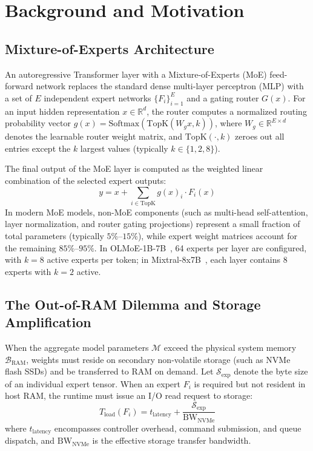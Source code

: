\section{Background and Motivation}
\label{sec:background}

\subsection{Mixture-of-Experts Architecture}
An autoregressive Transformer layer with a Mixture-of-Experts (MoE) feed-forward network replaces the standard dense multi-layer perceptron (MLP) with a set of $E$ independent expert networks $\{F_i\}_{i=1}^E$ and a gating router $G(x)$. For an input hidden representation $x \in \mathbb{R}^d$, the router computes a normalized routing probability vector $g(x) = \text{Softmax}(\text{TopK}(W_g x, k))$, where $W_g \in \mathbb{R}^{E \times d}$ denotes the learnable router weight matrix, and $\text{TopK}(\cdot, k)$ zeroes out all entries except the $k$ largest values (typically $k \in \{1, 2, 8\}$).

The final output of the MoE layer is computed as the weighted linear combination of the selected expert outputs:
\begin{equation}
    y = x + \sum_{i \in \text{TopK}} g(x)_i \cdot F_i(x)
    \label{eq:moe_forward}
\end{equation}
In modern MoE models, non-MoE components (such as multi-head self-attention, layer normalization, and router gating projections) represent a small fraction of total parameters (typically $5\%$--$15\%$), while expert weight matrices account for the remaining $85\%$--$95\%$. In OLMoE-1B-7B~\citep{muennighoff2024olmoe}, 64 experts per layer are configured, with $k=8$ active experts per token; in Mixtral-8x7B~\citep{jiang2024mixtral}, each layer contains 8 experts with $k=2$ active.

\subsection{The Out-of-RAM Dilemma and Storage Amplification}
When the aggregate model parameters $\mathcal{M}$ exceed the physical system memory $\mathcal{B}_{\text{RAM}}$, weights must reside on secondary non-volatile storage (such as NVMe flash SSDs) and be transferred to RAM on demand.
Let $\mathcal{S}_{\text{exp}}$ denote the byte size of an individual expert tensor. When an expert $F_i$ is required but not resident in host RAM, the runtime must issue an I/O read request to storage:
\begin{equation}
    T_{\text{load}}(F_i) = t_{\text{latency}} + \frac{\mathcal{S}_{\text{exp}}}{\text{BW}_{\text{NVMe}}}
    \label{eq:io_latency}
\end{equation}
where $t_{\text{latency}}$ encompasses controller overhead, command submission, and queue dispatch, and $\text{BW}_{\text{NVMe}}$ is the effective storage transfer bandwidth.

